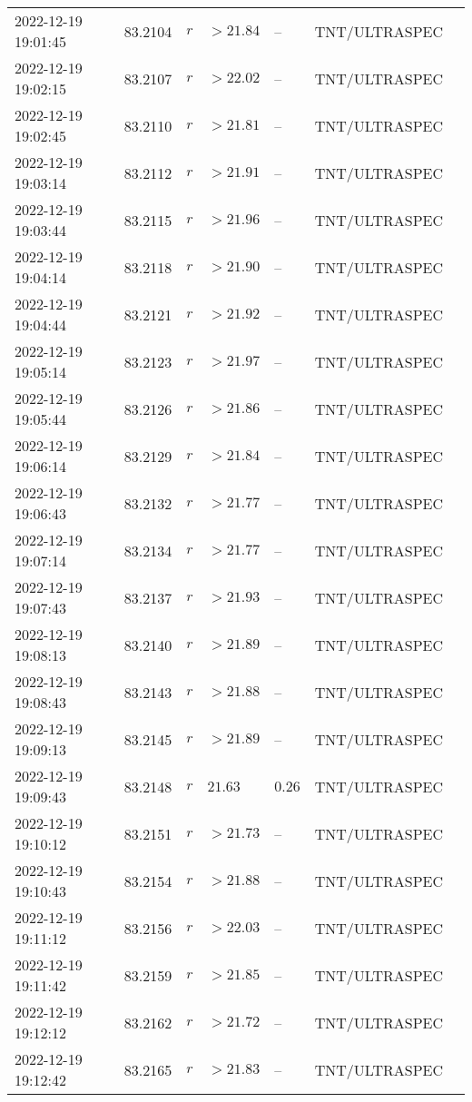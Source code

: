 \documentclass{nature_plusfigure}
\begin{document}
\begin{supplement}
\begin{center}
\begin{longtable}{lllllll}
2022-12-19 19:01:45 & 83.2104 & $r$ & $>21.84$ & -- & TNT/ULTRASPEC &  \\ 
2022-12-19 19:02:15 & 83.2107 & $r$ & $>22.02$ & -- & TNT/ULTRASPEC &  \\ 
2022-12-19 19:02:45 & 83.2110 & $r$ & $>21.81$ & -- & TNT/ULTRASPEC &  \\ 
2022-12-19 19:03:14 & 83.2112 & $r$ & $>21.91$ & -- & TNT/ULTRASPEC &  \\ 
2022-12-19 19:03:44 & 83.2115 & $r$ & $>21.96$ & -- & TNT/ULTRASPEC &  \\ 
2022-12-19 19:04:14 & 83.2118 & $r$ & $>21.90$ & -- & TNT/ULTRASPEC &  \\ 
2022-12-19 19:04:44 & 83.2121 & $r$ & $>21.92$ & -- & TNT/ULTRASPEC &  \\ 
2022-12-19 19:05:14 & 83.2123 & $r$ & $>21.97$ & -- & TNT/ULTRASPEC &  \\ 
2022-12-19 19:05:44 & 83.2126 & $r$ & $>21.86$ & -- & TNT/ULTRASPEC &  \\ 
2022-12-19 19:06:14 & 83.2129 & $r$ & $>21.84$ & -- & TNT/ULTRASPEC &  \\ 
2022-12-19 19:06:43 & 83.2132 & $r$ & $>21.77$ & -- & TNT/ULTRASPEC &  \\ 
2022-12-19 19:07:14 & 83.2134 & $r$ & $>21.77$ & -- & TNT/ULTRASPEC &  \\ 
2022-12-19 19:07:43 & 83.2137 & $r$ & $>21.93$ & -- & TNT/ULTRASPEC &  \\ 
2022-12-19 19:08:13 & 83.2140 & $r$ & $>21.89$ & -- & TNT/ULTRASPEC &  \\ 
2022-12-19 19:08:43 & 83.2143 & $r$ & $>21.88$ & -- & TNT/ULTRASPEC &  \\ 
2022-12-19 19:09:13 & 83.2145 & $r$ & $>21.89$ & -- & TNT/ULTRASPEC &  \\ 
2022-12-19 19:09:43 & 83.2148 & $r$ & $21.63$ & $0.26$ & TNT/ULTRASPEC &  \\ 
2022-12-19 19:10:12 & 83.2151 & $r$ & $>21.73$ & -- & TNT/ULTRASPEC &  \\ 
2022-12-19 19:10:43 & 83.2154 & $r$ & $>21.88$ & -- & TNT/ULTRASPEC &  \\ 
2022-12-19 19:11:12 & 83.2156 & $r$ & $>22.03$ & -- & TNT/ULTRASPEC &  \\ 
2022-12-19 19:11:42 & 83.2159 & $r$ & $>21.85$ & -- & TNT/ULTRASPEC &  \\ 
2022-12-19 19:12:12 & 83.2162 & $r$ & $>21.72$ & -- & TNT/ULTRASPEC &  \\ 
2022-12-19 19:12:42 & 83.2165 & $r$ & $>21.83$ & -- & TNT/ULTRASPEC &  \\ 

\end{longtable}
\end{center}
\end{supplement}
\end{document}
